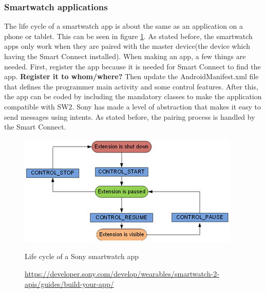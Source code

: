 \subsubsection{Smartwatch applications}
\label{subsubsec:sw_app}
The life cycle of a smartwatch app is about the same as an application on a phone or tablet. This can be seen in figure \ref{fig:sw2_lifecycle}. As stated before, the smartwatch apps only work when they are paired with the master device(the device which having the Smart Connect installed). When making an app, a few things are needed. First, register the app because it is needed for Smart Connect to find the app. \textbf{Register it to whom/where?}\pend
Then update the AndroidManifest.xml file that defines the programmer main activity and some control features. After this, the app can be coded by including the mandatory classes to make the application compatible with SW2. \pend  
Sony has made a level of abstraction that makes it easy to send messages using intents. As stated before, the pairing process is handled by the Smart Connect. 
\begin{figure}
\begin{center}
\includegraphics[scale=0.5]{images/applifecycle.jpg}
\end{center}
  \caption{Life cycle of a Sony smartwatch app}
  \label{fig:sw2_lifecycle}
  \caption*{\url{https://developer.sony.com/develop/wearables/smartwatch-2-apis/guides/build-your-app/}}
\end{figure}